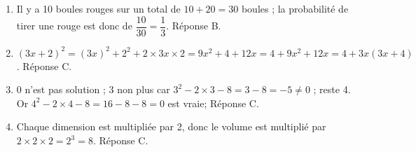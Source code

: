 
\medskip

%
%
\begin{enumerate}
\item Il y a 10 boules rouges sur un total de $10 + 20 = 30$ boules ; la probabilité de tirer une rouge est donc de $\dfrac{10}{30} = \dfrac{1}{3}$. Réponse B.
\item $(3x + 2)^2 = (3x)^2 + 2^2 + 2 \times 3x\times 2 = 9x^2 + 4 + 12x = 4 + 9x^2 + 12x = 4 + 3x(3x + 4)$. Réponse C.
\item $0$ n'est pas solution ; 3 non plus car $3^2 - 2\times 3 - 8 = 3 - 8 = - 5 \ne 0$ ; reste 4. Or  $4^2 - 2 \times 4 - 8 = 16 - 8 - 8 = 0$ est vraie; Réponse C.
\item Chaque dimension est multipliée par 2, donc le volume est multiplié par $2 \times 2 \times 2 = 2^3 = 8$. Réponse C. 
\end{enumerate}

\bigskip

